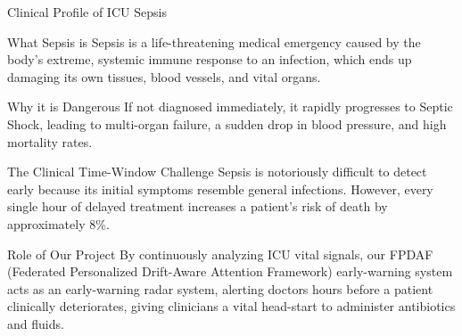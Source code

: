 \documentclass[aspectratio=169, 11pt]{beamer}
\begin{document}
\begin{frame}{Clinical Profile of ICU Sepsis}
    \begin{block}{What Sepsis is}
        \scriptsize
        Sepsis is a life-threatening medical emergency caused by the body's extreme, systemic immune response to an infection, which ends up damaging its own tissues, blood vessels, and vital organs.
    \end{block}
    
    \begin{block}{Why it is Dangerous}
        \scriptsize
        If not diagnosed immediately, it rapidly progresses to Septic Shock, leading to multi-organ failure, a sudden drop in blood pressure, and high mortality rates.
    \end{block}
    
    \begin{block}{The Clinical Time-Window Challenge}
        \scriptsize
        Sepsis is notoriously difficult to detect early because its initial symptoms resemble general infections. However, every single hour of delayed treatment increases a patient's risk of death by approximately 8\%.
    \end{block}
    
    \begin{alertblock}{Role of Our Project}
        \scriptsize
        By continuously analyzing ICU vital signals, our FPDAF (Federated Personalized Drift-Aware Attention Framework) early-warning system acts as an early-warning radar system, alerting doctors hours before a patient clinically deteriorates, giving clinicians a vital head-start to administer antibiotics and fluids.
    \end{alertblock}
\end{frame}
\end{document}
